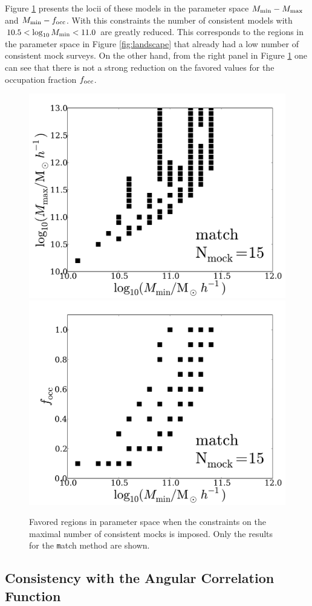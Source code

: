 \documentclass[usenatbib]{mn2e}
\begin{document}
Figure \ref{fig:restriction_mock} presents the locii of these models
in the parameter space $M_{\rm min}-M_{\rm max}$ and $M_{\rm
  min}-f_{\rm occ}$. With this constraints the
number of consistent models with  $10.5 < \log_{10}M_{\rm min}< 11.0$ are
greatly reduced. This corresponds to the regions in the parameter
space in Figure \ref{fig:landscape} that already had a low number of
consistent mock surveys. On the other hand, from the right panel in
Figure \ref{fig:restriction_mock} one can see that there is not a
strong reduction on the favored values for the occupation fraction
$f_{\rm occ}$. 

\begin{figure}
\begin{center}
\includegraphics[width=0.46\linewidth,angle=0]{./plots/Fig5_match_mass_mock.pdf} 
\hspace{5mm}
\includegraphics[width=0.46\linewidth,angle=0]{./plots/Fig5_match_f_occ_mock.pdf}
\end{center}  
\caption{Favored regions in parameter space when the constraints on
  the maximal number of consistent mocks is imposed. Only the results
  for the {\texttt match} method are shown.
  \label{fig:restriction_mock}}  
\end{figure}



\subsection{Consistency with the Angular Correlation Function}
\end{document}
